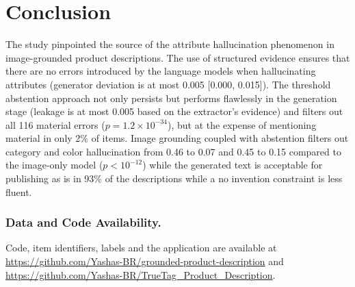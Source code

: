 \documentclass[runningheads]{llncs}
\newif\ifanonymous
\begin{document}
\section{Conclusion}\label{sec:conclusion}
The study pinpointed the source of the attribute hallucination phenomenon in image-grounded product descriptions. The use of structured evidence ensures that there are no errors introduced by the language models when hallucinating attributes (generator deviation is at most 0.005 [0.000, 0.015]). The threshold abstention approach not only persists but performs flawlessly in the generation stage (leakage is at most 0.005 based on the extractor’s evidence) and filters out all 116 material errors ($p=1.2 \times 10^{-34}$), but at the expense of mentioning material in only 2\% of items. Image grounding coupled with abstention filters out category and color hallucination from 0.46 to 0.07 and 0.45 to 0.15 compared to the image-only model ($p < 10^{-12}$) while the generated text is acceptable for publishing as is in 93\% of the descriptions while a no invention constraint is less fluent.

\subsubsection*{Data and Code Availability.}
\ifanonymous
Code, item identifiers, labels and the application will be released publicly upon acceptance.
\else
Code, item identifiers, labels and the application are available at \url{https://github.com/Yashas-BR/grounded-product-description} and \url{https://github.com/Yashas-BR/TrueTag_Product_Description}.
\fi



\end{document}

